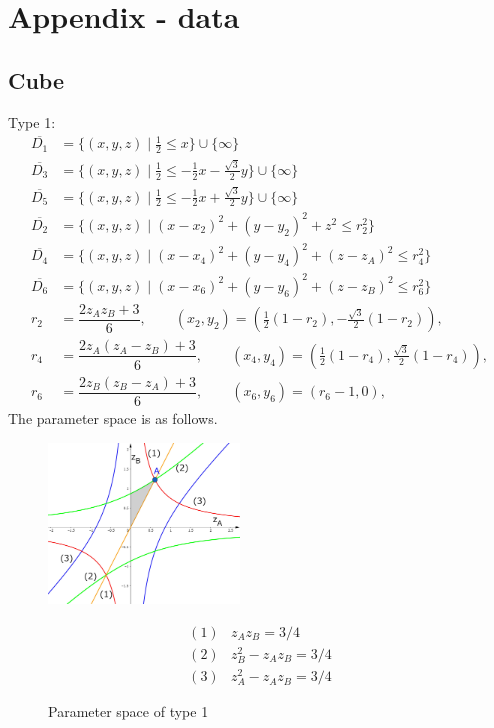 \documentclass[suppldata, dvipdfmx]{interact}
\theoremstyle{plain}%
\theoremstyle{definition}
\theoremstyle{remark}
\theoremstyle{problemstyle}
\begin{document}
\section{Appendix - data}

\subsection{Cube}
Type 1:
\begin{align*}
\overline{D_1}&= \{ (x,y,z) \mid \frac{1}{2} \le x \} \cup \{ \infty \}\\
\overline{D_3}&=\{(x,y,z) \mid \frac{1}{2} \le -\frac{1}{2}x-\frac{\sqrt{3}}{2}y \} \cup\{\infty\}\\
\overline{D_5}&=\{(x,y,z) \mid \frac{1}{2} \le -\frac{1}{2}x+\frac{\sqrt{3}}{2}y \} \cup\{\infty\}\\
\overline{D_2}&=\{(x,y,z) \mid (x-x_2)^2+(y-y_2)^2+z^2 \le r_2^2 \} \\
\overline{D_4}&=\{(x,y,z) \mid (x-x_4)^2+(y-y_4)^2+(z-z_A)^2 \le r_4^2 \} \\
\overline{D_6}&=\{(x,y,z) \mid (x-x_6)^2+(y-y_6)^2+(z-z_B)^2 \le r_6^2 \} \\
 r_2 &= \dfrac{2z_Az_B + 3}{6}, \qquad
(x_2, y_2) = \left(\frac{1}{2}(1-r_2), -\frac{\sqrt{3}}{2}(1-r_2)\right),\\
 r_4 &= \dfrac{2z_A(z_A-z_B) + 3}{6}, \qquad
(x_4, y_4) = \left(\frac{1}{2}(1-r_4), \frac{\sqrt{3}}{2}(1-r_4)\right),\\
 r_6 &= \dfrac{2z_B(z_B-z_A) + 3}{6}, \qquad
(x_6, y_6) = \left(r_6-1, 0\right),
\end{align*} 
The parameter space is as follows.
\begin{figure}[h]
 \begin{minipage}[]{0.5\textwidth}
 \centering
 \includegraphics[width=2in,
 keepaspectratio]{./img/graph/cubeALimit.jpg}
 \caption{Parameter space of type 1}
 \end{minipage}
 \hspace*{\fill}
 \begin{minipage}[]{0.5\textwidth}
  \centering
\begin{align*}
(1)& z_Az_B = 3/4\\
(2)& z_B^2 - z_A z_B = 3/4\\
(3)& z_A^2 - z_A z_B = 3/4
\end{align*}
 \end{minipage}
\end{figure}
\end{document}
